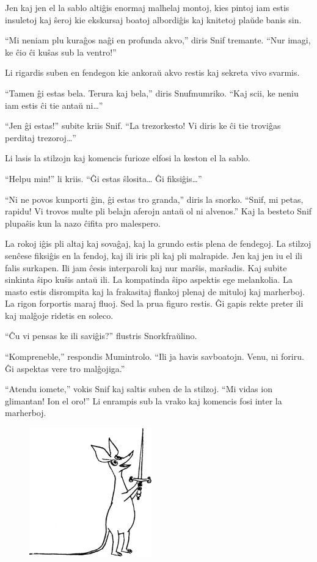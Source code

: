 Jen kaj jen el la sablo altiĝis enormaj malhelaj montoj, kies pintoj iam estis insuletoj kaj ŝeroj kie ekskursaj boatoj albordiĝis kaj knitetoj plaŭde banis sin.

``Mi neniam plu kuraĝos naĝi en profunda akvo,'' diris Snif tremante. ``Nur imagi, ke ĉio ĉi kuŝas sub la ventro!''

Li rigardis suben en fendegon kie ankoraŭ akvo restis kaj sekreta vivo svarmis.

``Tamen ĝi estas bela. Terura kaj bela,'' diris Snufmumriko. ``Kaj scii, ke neniu iam estis ĉi tie antaŭ ni{\ldots}''

``Jen ĝi estas!'' subite kriis Snif. ``La trezorkesto! Vi diris ke ĉi tie troviĝas perditaj trezoroj{\ldots}''

Li lasis la stilzojn kaj komencis furioze elfosi la keston el la sablo.

``Helpu min!'' li kriis. ``Ĝi estas ŝlosita{\ldots} Ĝi fiksiĝis{\ldots}''

``Ni ne povos kunporti ĝin, ĝi estas tro granda,'' diris la snorko. ``Snif, mi petas, rapidu! Vi trovos multe pli belajn aferojn antaŭ ol ni alvenos.'' Kaj la besteto Snif plupaŝis kun la nazo ĉifita pro malespero.

La rokoj iĝis pli altaj kaj sovaĝaj, kaj la grundo estis plena de fendegoj. La stilzoj senĉese fiksiĝis en la fendoj, kaj ili iris pli kaj pli malrapide. Jen kaj jen iu el ili falis surkapen. Ili jam ĉesis interparoli kaj nur marŝis, marŝadis. Kaj subite sinkinta ŝipo kuŝis antaŭ ili. La kompatinda ŝipo aspektis ege melankolia. La masto estis disrompita kaj la frakasitaj flankoj plenaj de mituloj kaj marherboj. La rigon forportis maraj fluoj. Sed la prua figuro restis. Ĝi gapis rekte preter ili kaj malĝoje ridetis en soleco.

``Ĉu vi pensas ke ili saviĝis?'' flustris Snorkfraŭlino.

``Kompreneble,'' respondis Mumintrolo. ``Ili ja havis savboatojn. Venu, ni foriru. Ĝi aspektas vere tro malĝojiga.''

``Atendu iomete,'' vokis Snif kaj saltis suben de la stilzoj. ``Mi vidas ion glimantan! Ion el oro!'' Li enrampis sub la vrako kaj komencis fosi inter la marherboj.

\begin{figure}[htbp]
\centering
\includegraphics[width=150pt,height=159pt]{7-5.png}
\caption{}
\label{7-5}
\end{figure}

